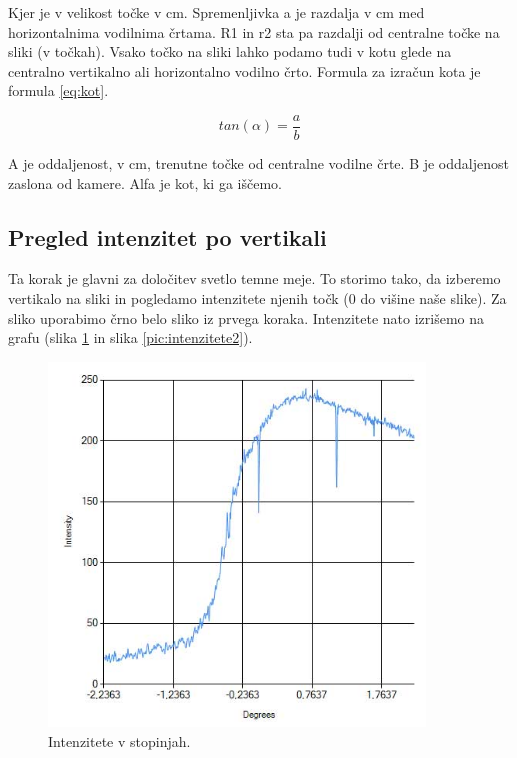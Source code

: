 \documentclass[oneside, a4paper, 12pt]{book}
\begin{document}
Kjer je v velikost točke v cm. Spremenljivka a je razdalja v cm med horizontalnima vodilnima črtama. R1 in r2 sta pa razdalji od centralne točke na sliki (v točkah).
Vsako točko na sliki lahko podamo tudi v kotu glede na centralno vertikalno ali horizontalno vodilno črto. Formula za izračun kota je formula \ref{eq:kot}.

\begin{equation}
tan(\alpha)=\dfrac{a}{b}
\label{eq:kot}
\end{equation}

A je oddaljenost, v cm, trenutne točke od centralne vodilne črte. B je oddaljenost zaslona od kamere. Alfa je kot, ki ga iščemo.

\subsection{Pregled intenzitet po vertikali}
Ta korak je glavni za določitev svetlo temne meje. To storimo tako, da izberemo vertikalo na sliki in pogledamo intenzitete njenih točk (0 do višine naše slike). Za sliko uporabimo črno belo sliko iz prvega koraka. Intenzitete nato izrišemo na grafu (slika \ref{pic:intenzitete1} in slika \ref{pic:intenzitete2}).

\begin{figure}
\begin{center}
\includegraphics[width=10cm]{slike/intenzitete.jpg}
\end{center}
\caption{Intenzitete v stopinjah.}
\label{pic:intenzitete1}
\end{figure}
\end{document}
